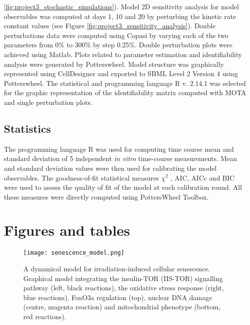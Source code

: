 \ref{fig:project3_stochastic_simulations}). Model 2D sensitivity analysis for model observables was computed at days 1, 10 and 20 by perturbing the kinetic rate constant values (see Figure \ref{fig:project3_sensitivity_analysis}). Double perturbations data were computed using Copasi by varying each of the two parameters from 0\% to 300\% by step 0.25\%. Double perturbation plots were achieved using Matlab. Plots related to parameter estimation and identifiability analysis were generated by Potterswheel. Model structure was graphically represented using CellDesigner \citep{Funahashi2003, Funahashi2008} and exported to SBML \citep{hucka2003systems} Level 2 Version 4 using Potterswheel. The statistical and programming language R v. 2.14.1 \citep{RCoreTeam} was selected for the graphic representation of the identifiability matrix computed with MOTA and single perturbation plots.


\subsection{Statistics}
\label{project3-subsec:Statistics}
The programming language R was used for computing time course mean and standard deviation of 5 independent \emph{in vitro} time-course measurements. Mean and standard deviation values were then used for calibrating the model observables. The goodness-of-fit statistical measures $\chi^2$ \citep{Maiwald2008}, AIC, AICc \citep{Akaike1973} and BIC \citep{Schwarz1978} were used to assess the quality of fit of the model at each calibration round. All these measures were directly computed using PottersWheel Toolbox. 


\section{Figures and tables}
\label{project3-sec:Figures and tables}

\clearpage

\begin{figure}[tb]
	\begin{center}
		\texttt{[image: senescence\_model.png]}
		\caption[A dynamical model for irradiation-induced cellular senescence]{A dynamical model for irradiation-induced cellular senescence. Graphical model integrating the insulin-TOR (IIS-TOR) signalling pathway (left, black reactions), the oxidative stress response (right, blue reactions), FoxO3a regulation (top), nuclear DNA damage (centre, magenta reaction) and mitochondrial phenotype (bottom, red reactions).}
		\label{fig:project3_senescence_model}
	\end{center}
\end{figure}
\clearpage


